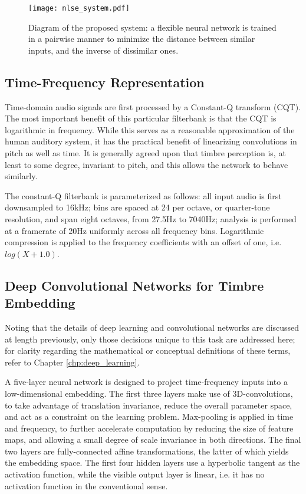 \begin{figure}[t]
\centering
\texttt{[image: nlse\_system.pdf]}
\caption{Diagram of the proposed system: a flexible neural network is trained in a pairwise manner to minimize the distance between similar inputs, and the inverse of dissimilar ones.}
\label{fig:nlse}
\end{figure}


\subsection{Time-Frequency Representation}
\label{subsec:timbre_tfr}

Time-domain audio signals are first processed by a Constant-Q transform (CQT).
The most important benefit of this particular filterbank is that the CQT is logarithmic in frequency.
While this serves as a reasonable approximation of the human auditory system, it has the practical benefit of linearizing convolutions in pitch as well as time.
It is generally agreed upon that timbre perception is, at least to some degree, invariant to pitch, and this allows the network to behave similarly.

The constant-Q filterbank is parameterized as follows: all input audio is first downsampled to 16kHz; bins are spaced at 24 per octave, or quarter-tone resolution, and span eight octaves, from 27.5Hz to 7040Hz; analysis is performed at a framerate of 20Hz uniformly across all frequency bins.
Logarithmic compression is applied to the frequency coefficients with an offset of one, i.e. $log(X + 1.0)$. %


\subsection{Deep Convolutional Networks for Timbre Embedding}
\label{subsec:timbre_deepnet}

Noting that the details of deep learning and convolutional networks are discussed at length previously, only those decisions unique to this task are addressed here; for clarity regarding the mathematical or conceptual definitions of these terms, refer to Chapter \ref{chp:deep_learning}.

A five-layer neural network is designed to project time-frequency inputs into a low-dimensional embedding.
The first three layers make use of 3D-convolutions, to take advantage of translation invariance, reduce the overall parameter space, and act as a constraint on the learning problem.
Max-pooling is applied in time and frequency, to further accelerate computation by reducing the size of feature maps, and allowing a small degree of scale invariance in both directions.
The final two layers are fully-connected affine transformations, the latter of which yields the embedding space.
The first four hidden layers use a hyperbolic tangent as the activation function, while the visible output layer is linear, i.e. it has no activation function in the conventional sense.

